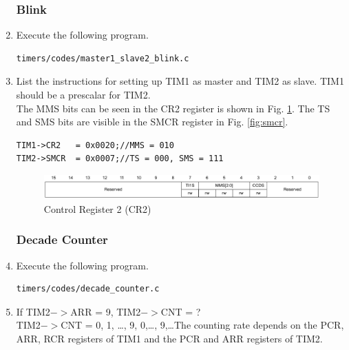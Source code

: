 \begin{enumerate}[label=\arabic*.,ref=\theenumi]
\subsubsection{Blink}
\item Execute the following program.
\begin{lstlisting}
timers/codes/master1_slave2_blink.c
\end{lstlisting}
\item List the instructions for setting up TIM1 as master and TIM2 as slave. TIM1 should be a prescalar for TIM2.
\\
\solution The MMS bits can be seen in the CR2 register is shown in Fig. \ref{fig:cr2}. The TS and SMS bits are visible in the SMCR register
in Fig. \ref{fig:smcr}. 
\begin{lstlisting}
TIM1->CR2	= 0x0020;//MMS = 010
TIM2->SMCR	= 0x0007;//TS = 000, SMS = 111	
\end{lstlisting}
%
\begin{figure}[!h]
\begin{center}
\includegraphics[width=\columnwidth]{stm32/timers/figs/cr2}
\end{center}
\caption{Control Register 2 (CR2)}
\label{fig:cr2}
\end{figure}
%
\subsubsection{Decade Counter}
\item Execute the following program.
\begin{lstlisting}
timers/codes/decade_counter.c
\end{lstlisting}
%
\item If TIM2$->$ARR = 9, TIM2$->$CNT = ?
\\
\solution TIM2$->$CNT = 0, 1, \dots, 9, 0,\dots, 9,\dots The counting rate depends on the PCR, ARR, RCR registers of TIM1 and the PCR
and ARR registers of TIM2.
\end{enumerate}
